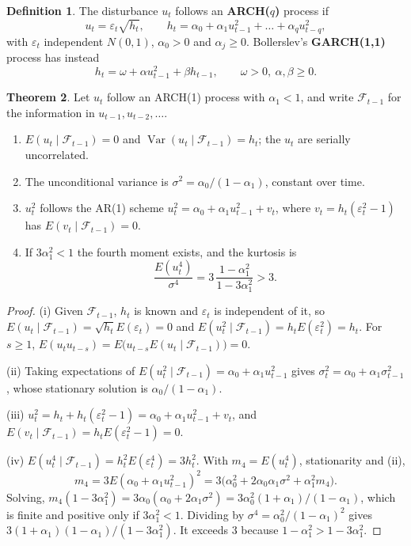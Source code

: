 \documentclass[11pt,a4paper]{article}
\numberwithin{equation}{section}
\DeclareMathOperator{\Var}{Var}
\theoremstyle{definition}
\newtheorem{thm}{Theorem}[subsection]
\newtheorem{defn}[thm]{Definition}
\begin{document}
\begin{defn}
The disturbance $u_t$ follows an \textbf{ARCH($q$)} process if
\[
u_t = \varepsilon_t\sqrt{h_t}, \qquad h_t = \alpha_0 + \alpha_1u_{t-1}^2 + \dots + \alpha_qu_{t-q}^2,
\]
with $\varepsilon_t$ independent $N(0, 1)$, $\alpha_0 > 0$ and $\alpha_j \geq 0$. Bollerslev's \textbf{GARCH(1,1)} process has instead
\[
h_t = \omega + \alpha u_{t-1}^2 + \beta h_{t-1}, \qquad \omega > 0,\ \alpha, \beta \geq 0 .
\]
\end{defn}

\begin{thm}
\label{thm:arch1}
Let $u_t$ follow an ARCH(1) process with $\alpha_1 < 1$, and write $\mathcal F_{t-1}$ for the information in $u_{t-1}, u_{t-2}, \dots$.
\begin{enumerate}[label=(\roman*)]
\item $E(u_t \mid \mathcal F_{t-1}) = 0$ and $\Var(u_t \mid \mathcal F_{t-1}) = h_t$; the $u_t$ are serially uncorrelated.
\item The unconditional variance is $\sigma^2 = \alpha_0/(1 - \alpha_1)$, constant over time.
\item $u_t^2$ follows the AR(1) scheme $u_t^2 = \alpha_0 + \alpha_1u_{t-1}^2 + v_t$, where $v_t = h_t(\varepsilon_t^2 - 1)$ has $E(v_t \mid \mathcal F_{t-1}) = 0$.
\item If $3\alpha_1^2 < 1$ the fourth moment exists, and the kurtosis is
\[
\frac{E(u_t^4)}{\sigma^4} = 3\,\frac{1 - \alpha_1^2}{1 - 3\alpha_1^2} > 3 .
\]
\end{enumerate}
\end{thm}

\begin{proof}
(i) Given $\mathcal F_{t-1}$, $h_t$ is known and $\varepsilon_t$ is independent of it, so $E(u_t \mid \mathcal F_{t-1}) = \sqrt{h_t}E(\varepsilon_t) = 0$ and
$E(u_t^2 \mid \mathcal F_{t-1}) = h_tE(\varepsilon_t^2) = h_t$. For $s \geq 1$, $E(u_tu_{t-s}) = E\bigl(u_{t-s}E(u_t \mid \mathcal F_{t-1})\bigr) = 0$.

(ii) Taking expectations of $E(u_t^2 \mid \mathcal F_{t-1}) = \alpha_0 + \alpha_1u_{t-1}^2$ gives $\sigma_t^2 = \alpha_0 + \alpha_1\sigma_{t-1}^2$, whose stationary solution is $\alpha_0/(1 - \alpha_1)$.

(iii) $u_t^2 = h_t + h_t(\varepsilon_t^2 - 1) = \alpha_0 + \alpha_1u_{t-1}^2 + v_t$, and $E(v_t \mid \mathcal F_{t-1}) = h_tE(\varepsilon_t^2 - 1) = 0$.

(iv) $E(u_t^4 \mid \mathcal F_{t-1}) = h_t^2E(\varepsilon_t^4) = 3h_t^2$. With $m_4 = E(u_t^4)$, stationarity and (ii),
\[
m_4 = 3E(\alpha_0 + \alpha_1u_{t-1}^2)^2 = 3\bigl(\alpha_0^2 + 2\alpha_0\alpha_1\sigma^2 + \alpha_1^2m_4\bigr) .
\]
Solving, $m_4(1 - 3\alpha_1^2) = 3\alpha_0(\alpha_0 + 2\alpha_1\sigma^2) = 3\alpha_0^2(1 + \alpha_1)/(1 - \alpha_1)$, which is finite and positive only if $3\alpha_1^2 < 1$. Dividing by
$\sigma^4 = \alpha_0^2/(1 - \alpha_1)^2$ gives $3(1 + \alpha_1)(1 - \alpha_1)/(1 - 3\alpha_1^2)$. It exceeds $3$ because $1 - \alpha_1^2 > 1 - 3\alpha_1^2$.
\end{proof}
\end{document}
